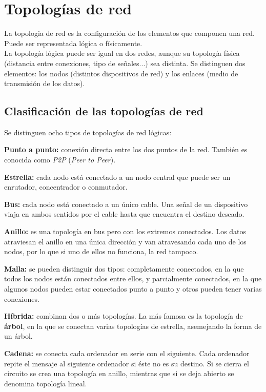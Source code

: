 \documentclass[a4paper, 11pt]{report} %
\begin{document}
\newpage
\section{Topologías de red}
\label{topdred}
La \gls{topologia} de red es la configuración de los elementos que componen una red. Puede ser representada lógica o físicamente. \\
La topología lógica puede ser igual en dos redes, aunque su topología física (distancia entre conexiones, tipo de señales...) sea distinta. 
Se distinguen dos elementos: los nodos (distintos dispositivos de red) y los enlaces (medio de transmisión de los datos).
\subsection{Clasificación de las topologías de red}
Se distinguen ocho tipos de topologías de red lógicas: \cite{bicsi-02}
\renewcommand{\labelitemi}{$\bullet$}
\begin{description}
\item \textbf{Punto a punto:} conexión directa entre los dos puntos de la red. También es conocida como \textit{P2P} (\textit{Peer to Peer}).
\item \textbf{Estrella:} cada nodo está conectado a un nodo central que puede ser un enrutador, concentrador o conmutador.
\item \textbf{Bus:} cada nodo está conectado a un único cable. Una señal de un dispositivo viaja en ambos sentidos por el cable hasta que encuentra el destino deseado.
\item \textbf{Anillo:} es una topología en bus pero con los extremos conectados. Los datos atraviesan el anillo en una única dirección y van atravesando cada uno de los nodos, por lo que si uno de ellos no funciona, la red tampoco.
\item \textbf{Malla:} se pueden distinguir dos tipos: completamente conectados, en la que todos los nodos están conectados entre ellos, y parcialmente conectados, en la que algunos nodos pueden estar conectados punto a punto y otros pueden tener varias conexiones.
\item \textbf{Híbrida:} combinan dos o más topologías. La más famosa es la topología de \textbf{árbol}, en la que se conectan varias topologías de estrella, asemejando la forma de un árbol.
\item \textbf{Cadena:} se conecta cada ordenador en serie con el siguiente. Cada ordenador repite el mensaje al siguiente ordenador si éste no es su destino. Si se cierra el circuito se crea una topología en anillo, mientras que si se deja abierto se denomina topología lineal.
\end{description}
\end{document}
